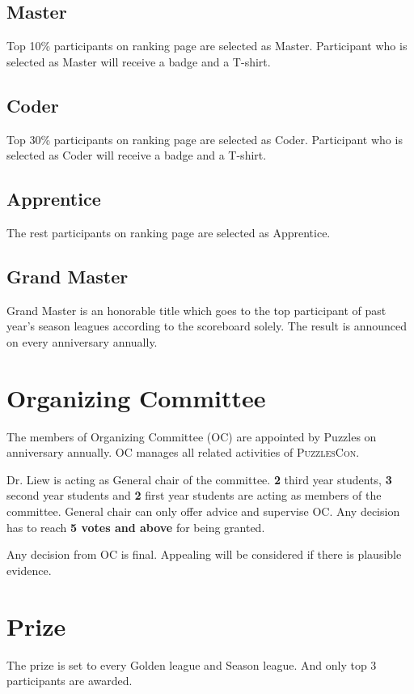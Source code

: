 \documentclass{article}
\begin{document}
\subsection{Master}

Top 10\% participants on ranking page are selected as Master. Participant who is selected as Master will receive a badge and a T-shirt.

\subsection{Coder}

Top 30\% participants on ranking page are selected as Coder. Participant who is selected as Coder will receive a badge and a T-shirt.

\subsection{Apprentice}

The rest participants on ranking page are selected as Apprentice.

\subsection{Grand Master}

Grand Master is an honorable title which goes to the top participant of past year's season leagues according to the scoreboard solely. The result is announced on every anniversary annually.

\section{Organizing Committee}

The members of Organizing Committee (OC) are appointed by Puzzles on anniversary annually. OC manages all related activities of \textsc{PuzzlesCon}.

Dr. Liew is acting as General chair of the committee. \textbf{2} third year students, \textbf{3} second year students and \textbf{2} first year students are acting as members of the committee. General chair can only offer advice and supervise OC. Any decision has to reach \textbf{5 votes and above} for being granted.

Any decision from OC is final. Appealing will be considered if there is plausible evidence.

\section{Prize}

The prize is set to every Golden league and Season league. And only top 3 participants are awarded.
\end{document}

